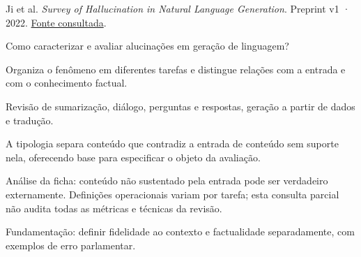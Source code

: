 {\small Ji et al. \textit{Survey of Hallucination in Natural Language Generation}. Preprint v1 · 2022. \href{https://arxiv.org/pdf/2202.03629v1}{Fonte consultada}.\par}

Como caracterizar e avaliar alucinações em geração de linguagem?

Organiza o fenômeno em diferentes tarefas e distingue relações com a entrada e com o conhecimento factual.

Revisão de sumarização, diálogo, perguntas e respostas, geração a partir de dados e tradução.

A tipologia separa conteúdo que contradiz a entrada de conteúdo sem suporte nela, oferecendo base para especificar o objeto da avaliação.

\begin{itemize}
\end{itemize}

Análise da ficha: conteúdo não sustentado pela entrada pode ser verdadeiro externamente. Definições operacionais variam por tarefa; esta consulta parcial não audita todas as métricas e técnicas da revisão.

Fundamentação: definir fidelidade ao contexto e factualidade separadamente, com exemplos de erro parlamentar.

